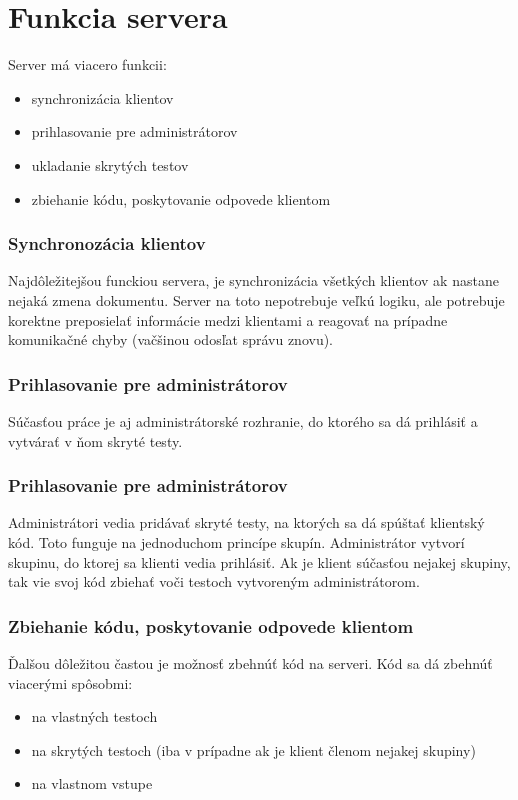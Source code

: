 \chapter{Funkcia servera}

\label{kap:server} %

Server má viacero funkcii:
\begin{itemize}
\item synchronizácia klientov
\item prihlasovanie pre administrátorov
\item ukladanie skrytých testov
\item zbiehanie kódu, poskytovanie odpovede klientom
\end{itemize}


\subsection{Synchronozácia klientov}
Najdôležitejšou funckiou servera, je synchronizácia všetkých klientov ak nastane nejaká zmena
dokumentu. Server na toto nepotrebuje veľkú logiku, ale potrebuje korektne preposielať informácie
medzi klientami a reagovať na prípadne komunikačné chyby (vačšinou odosľat správu znovu).


\subsection{Prihlasovanie pre administrátorov}
Súčasťou práce je aj administrátorské rozhranie, do ktorého sa dá prihlásiť a vytvárať v ňom
skryté testy.

\subsection{Prihlasovanie pre administrátorov}
Administrátori vedia pridávať skryté testy, na ktorých
sa dá spúštať klientský kód. Toto funguje na jednoduchom princípe skupín. Administrátor vytvorí 
skupinu, do ktorej sa klienti vedia prihlásiť. Ak je klient súčasťou nejakej skupiny, tak vie svoj
kód zbiehať voči testoch vytvoreným administrátorom.

\subsection{Zbiehanie kódu, poskytovanie odpovede klientom}
Ďalšou dôležitou častou je možnosť zbehnúť kód na serveri. Kód sa dá zbehnúť viacerými spôsobmi:
\begin{itemize}
\item na vlastných testoch
\item na skrytých testoch (iba v prípadne ak je klient členom nejakej skupiny)
\item na vlastnom vstupe
\end{itemize}

